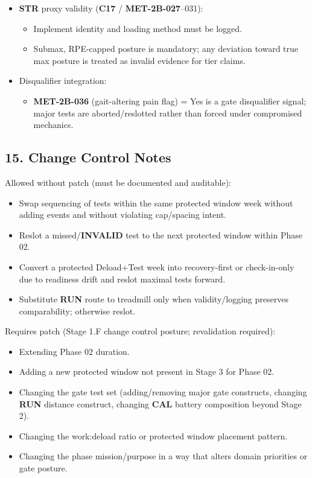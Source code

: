 \documentclass[10pt]{article}
\begin{document}
\begin{landscape}
\begin{itemize}
\item \textbf{STR} proxy validity (\textbf{C17} / \textbf{MET-2B-027}–031):
\begin{itemize}
\item Implement identity and loading method must be logged.
\item Submax, RPE-capped posture is mandatory; any deviation toward true max posture is treated as invalid evidence for tier claims.
\end{itemize}
\item Disqualifier integration:
\begin{itemize}
\item \textbf{MET-2B-036} (gait-altering pain flag) = Yes is a gate disqualifier signal; major tests are aborted/reslotted rather than forced under compromised mechanics.
\end{itemize}
\end{itemize}

\end{landscape}

\subsection*{15. Change Control Notes}

Allowed without patch (must be documented and auditable):

\begin{itemize}
\item Swap sequencing of tests within the same protected window week without adding events and without violating cap/spacing intent.
\item Reslot a missed/\textbf{INVALID} test to the next protected window within Phase 02.
\item Convert a protected Deload+Test week into recovery-first or check-in-only due to readiness drift and reslot maximal tests forward.
\item Substitute \textbf{RUN} route to treadmill only when validity/logging preserves comparability; otherwise reslot.
\end{itemize}

Requires patch (Stage 1.F change control posture; revalidation required):

\begin{itemize}
\item Extending Phase 02 duration.
\item Adding a new protected window not present in Stage 3 for Phase 02.
\item Changing the gate test set (adding/removing major gate constructs, changing \textbf{RUN} distance construct, changing \textbf{CAL} battery composition beyond Stage 2).
\item Changing the work:deload ratio or protected window placement pattern.
\item Changing the phase mission/purpose in a way that alters domain priorities or gate posture.
\end{itemize}
\end{document}
